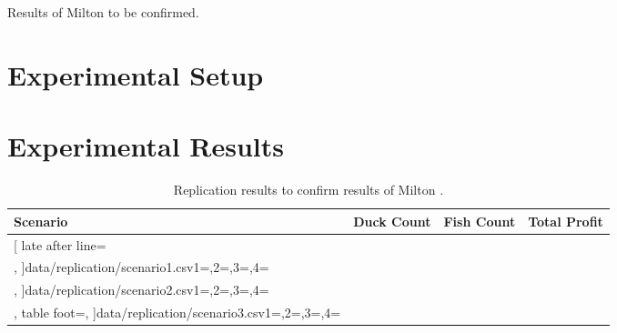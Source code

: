 \documentclass[sigconf, nonacm]{acmart}
\begin{document}

\begin{table}[htbp]
	\centering
	\caption{Results of Milton \cite{Milton2009} to be confirmed.}
	\label{tab:paper_results}
\end{table}
	


\section{Experimental Setup}

\section{Experimental Results}

\begin{table}[htbp]
	\centering
	\begin{tabular}{lccc}
		\toprule
		\textbf{Scenario} & \textbf{Duck Count} & \textbf{Fish Count} & \textbf{Total Profit} \\
		\midrule
		\csvreader[
		late after line=\\,
		]{data/replication/scenario1.csv}{1=\scenario,2=\duckcount,3=\fishcount,4=\totalprofit}{%
			\scenario & \duckcount & \fishcount & \totalprofit
		}
		\csvreader[
		late after line=\\,
		]{data/replication/scenario2.csv}{1=\scenario,2=\duckcount,3=\fishcount,4=\totalprofit}{%
			\scenario & \duckcount & \fishcount & \totalprofit
		}
		\csvreader[
		late after line=\\,
		table foot=\bottomrule,
		]{data/replication/scenario3.csv}{1=\scenario,2=\duckcount,3=\fishcount,4=\totalprofit}{%
			\scenario & \duckcount & \fishcount & \totalprofit
		}
	\end{tabular}
	\caption{Replication results to confirm results of Milton \cite{Milton2009}.}
	\label{tab:replication_results}
\end{table}
\end{document}
